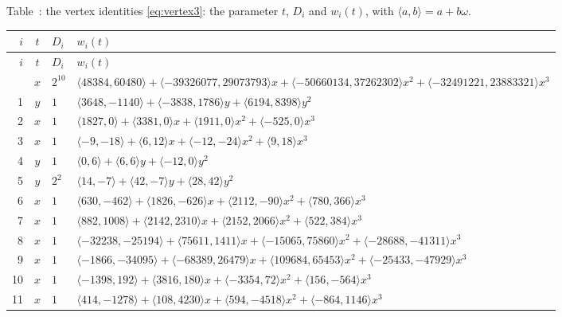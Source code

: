 \documentclass[11pt]{article}
\newcounter{dtab}
\begin{document}
{\footnotesize\setlength{\tabcolsep}{4pt}\setlength{\LTpre}{6pt}\setlength{\LTpost}{3pt}\renewcommand{\arraystretch}{1.05}
\begin{center}
\label{tab:id3}
Table~\thedtab: the vertex identities \eqref{eq:vertex3}: the parameter $t$, $D_i$ and $w_i(t)$, with $\langle a,b\rangle=a+b\omega$.
\end{center}
\begin{longtable}{@{}rcl>{\raggedright\arraybackslash}p{}@{}}
\toprule $i$ & $t$ & $D_i$ & $w_i(t)$\\\midrule\endfirsthead
\toprule $i$ & $t$ & $D_i$ & $w_i(t)$\\\midrule\endhead\bottomrule\endfoot
0 & $x$ & $2^{10}$ & $\langle 48384,60480\rangle+\langle -39326077,29073793\rangle x+\langle -50660134,37262302\rangle x^{2}+\langle -32491221,23883321\rangle x^{3}$\\
1 & $y$ & $1$ & $\langle 3648,-1140\rangle+\langle -3838,1786\rangle y+\langle 6194,8398\rangle y^{2}$\\
2 & $x$ & $1$ & $\langle 1827,0\rangle+\langle 3381,0\rangle x+\langle 1911,0\rangle x^{2}+\langle -525,0\rangle x^{3}$\\
3 & $x$ & $1$ & $\langle -9,-18\rangle+\langle 6,12\rangle x+\langle -12,-24\rangle x^{2}+\langle 9,18\rangle x^{3}$\\
4 & $y$ & $1$ & $\langle 0,6\rangle+\langle 6,6\rangle y+\langle -12,0\rangle y^{2}$\\
5 & $y$ & $2^{2}$ & $\langle 14,-7\rangle+\langle 42,-7\rangle y+\langle 28,42\rangle y^{2}$\\
6 & $x$ & $1$ & $\langle 630,-462\rangle+\langle 1826,-626\rangle x+\langle 2112,-90\rangle x^{2}+\langle 780,366\rangle x^{3}$\\
7 & $x$ & $1$ & $\langle 882,1008\rangle+\langle 2142,2310\rangle x+\langle 2152,2066\rangle x^{2}+\langle 522,384\rangle x^{3}$\\
8 & $x$ & $1$ & $\langle -32238,-25194\rangle+\langle 75611,1411\rangle x+\langle -15065,75860\rangle x^{2}+\langle -28688,-41311\rangle x^{3}$\\
9 & $x$ & $1$ & $\langle -1866,-34095\rangle+\langle -68389,26479\rangle x+\langle 109684,65453\rangle x^{2}+\langle -25433,-47929\rangle x^{3}$\\
10 & $x$ & $1$ & $\langle -1398,192\rangle+\langle 3816,180\rangle x+\langle -3354,72\rangle x^{2}+\langle 156,-564\rangle x^{3}$\\
11 & $x$ & $1$ & $\langle 414,-1278\rangle+\langle 108,4230\rangle x+\langle 594,-4518\rangle x^{2}+\langle -864,1146\rangle x^{3}$\\

\end{longtable}}
\end{document}
